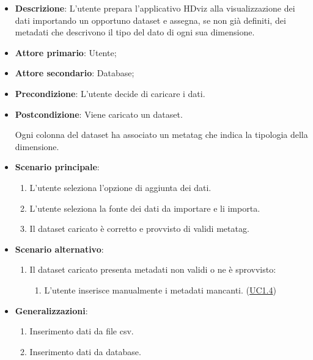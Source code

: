 \begin{itemize}
    \item \textbf{Descrizione}: L'utente prepara l'applicativo HDviz alla visualizzazione dei
                                dati importando un opportuno dataset e assegna, 
                                se non già definiti, dei metadati 
                                che descrivono il tipo del dato di ogni sua dimensione.
	
    \item \textbf{Attore primario}: Utente;
    \item \textbf{Attore secondario}: Database;
    
    
    \item \textbf{Precondizione}:   L'utente decide di caricare i dati.

    \item \textbf{Postcondizione}:  Viene caricato un dataset. 
    
                                    Ogni colonna del dataset ha associato
                                    un metatag che indica la tipologia della dimensione.

	\item \textbf{Scenario principale}:
		\begin{enumerate}
			\item L'utente seleziona l'opzione di aggiunta dei dati.
            \item L'utente seleziona la fonte dei dati da importare e li importa.
            \item Il dataset caricato è corretto e provvisto di validi metatag.
        \end{enumerate}
   
    \item \textbf{Scenario alternativo}:
		\begin{enumerate}
            \item Il dataset caricato presenta metadati non validi o ne è sprovvisto:
            \begin{enumerate}
                \item L'utente inserisce manualmente i metadati mancanti. (\hyperref[subsec:UC1.4]{UC1.4})
            \end{enumerate}
        \end{enumerate}

    \item \textbf{Generalizzazioni}:
    \begin{enumerate}
        \item Inserimento dati da file csv.
        \item Inserimento dati da database.
    \end{enumerate}
    

\end{itemize}
